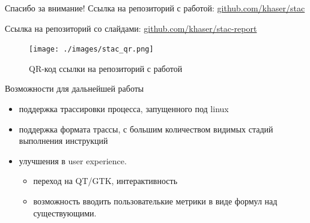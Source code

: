 \documentclass[10pt,aspectratio=169,hyperref={pdftex,unicode},xcolor=dvipsnames]{beamer}
\begin{document}
\begin{frame}{ Спасибо за внимание! }
    Ссылка на репозиторий с работой: \href{https://github.com/khaser/stac}{github.com/khaser/stac}

    Ссылка на репозиторий со слайдами: \href{https://github.com/khaser/stac}{github.com/khaser/stac-report}

    \begin{figure}[h]
        \texttt{[image: ./images/stac\_qr.png]}
        \caption{QR-код ссылки на репозиторий с работой}
        \label{qr}
    \end{figure}
\end{frame}

\begin{frame}{ Возможности для дальнейшей работы }
    \begin{itemize}
        \item поддержка трассировки процесса, запущенного под linux
        \item поддержка формата трассы, с большим количеством видимых стадий
              выполнения инструкций
        \item улучшения в user experience.
            \begin{itemize}
                \item переход на QT/GTK, интерактивность
                \item возможность вводить пользователькие метрики в виде формул над существующими.
            \end{itemize}
    \end{itemize}
\end{frame}

%
%
%
%
\end{document}
